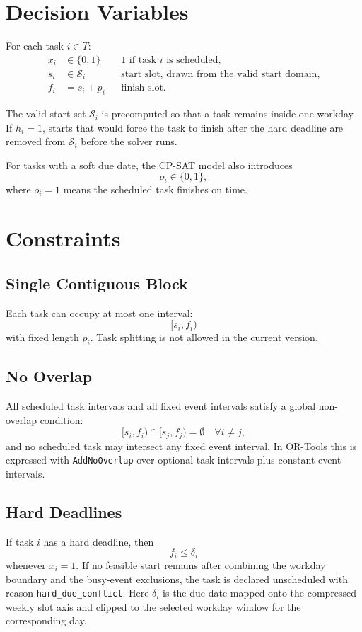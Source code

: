\documentclass[11pt]{article}
\begin{document}
\section{Decision Variables}
For each task \(i \in T\):
\begin{align*}
  x_i &\in \{0,1\} && \text{1 if task } i \text{ is scheduled,} \\
  s_i &\in \mathcal{S}_i && \text{start slot, drawn from the valid start domain,} \\
  f_i &= s_i + p_i && \text{finish slot.}
\end{align*}

The valid start set \(\mathcal{S}_i\) is precomputed so that a task remains inside one workday.
If \(h_i = 1\), starts that would force the task to finish after the hard deadline are removed
from \(\mathcal{S}_i\) before the solver runs.

For tasks with a soft due date, the CP-SAT model also introduces
\[
o_i \in \{0,1\},
\]
where \(o_i = 1\) means the scheduled task finishes on time.

\section{Constraints}

\subsection{Single Contiguous Block}
Each task can occupy at most one interval:
\[
[s_i, f_i)
\]
with fixed length \(p_i\). Task splitting is not allowed in the current version.

\subsection{No Overlap}
All scheduled task intervals and all fixed event intervals satisfy a global non-overlap condition:
\[
[s_i, f_i) \cap [s_j, f_j) = \emptyset \quad \forall i \ne j,
\]
and no scheduled task may intersect any fixed event interval. In OR-Tools this is expressed
with \texttt{AddNoOverlap} over optional task intervals plus constant event intervals.

\subsection{Hard Deadlines}
If task \(i\) has a hard deadline, then
\[
f_i \le \delta_i
\]
whenever \(x_i = 1\). If no feasible start remains after combining the workday boundary and the
busy-event exclusions, the task is declared unscheduled with reason \texttt{hard\_due\_conflict}.
Here \(\delta_i\) is the due date mapped onto the compressed weekly slot axis and clipped to the
selected workday window for the corresponding day.
\end{document}
